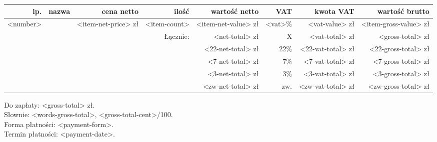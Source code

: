 \documentclass[polish]{dinbrief}
\providecommand{\tabularnewline}{\\}
\begin{document}
\begin{flushright}
\medskip{}
\begin{tabular}{r>{\raggedleft}p{0.2\paperwidth}rr|r|r|r|r|}
lp. & nazwa & cena netto & \multicolumn{1}{r}{ilość} & \multicolumn{1}{r}{wartość netto} & \multicolumn{1}{r}{VAT} & \multicolumn{1}{r}{kwota VAT} & \multicolumn{1}{r}{wartość brutto}\tabularnewline
\hline 
\multicolumn{1}{|r|}{<number>} & \multicolumn{1}{>{\raggedleft}p{0.2\paperwidth}|}{<item-name>} & \multicolumn{1}{r|}{<item-net-price> zł} & <item-count> & <item-net-value> zł & <vat>\% & <vat-value> zł & <item-gross-value> zł\tabularnewline
\hline 
 &  &  & Łącznie: & <net-total> zł & X & <vat-total> zł & <gross-total> zł\tabularnewline
\cline{5-8} 
 &  &  &  & <22-net-total> zł & 22\% & <22-vat-total> zł & <22-gross-total> zł\tabularnewline
\cline{5-8} 
 &  &  &  & <7-net-total> zł & 7\% & <7-vat-total> zł & <7-gross-total> zł\tabularnewline
\cline{5-8} 
 &  &  &  & <3-net-total> zł & 3\% & <3-vat-total> zł & <3-gross-total> zł\tabularnewline
\cline{5-8} 
 &  &  &  & <zw-net-total> zł & zw. & <zw-vat-total> zł & <zw-gross-total> zł\tabularnewline
\cline{5-8} 
\end{tabular}
\par\end{flushright}

\medskip{}



\begin{flushright}
Do zapłaty: <gross-total> zł.\\
Słownie: <words-gross-total>, <gross-total-cent>/100.\\
Forma płatności: <payment-form>.\\
Termin płatności: <payment-date>.
\par\end{flushright}
\end{document}

